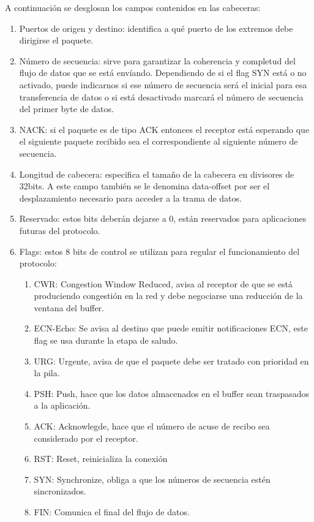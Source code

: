 \documentclass[a4paper,spanish,12pt]{book}
\begin{document}
A continuación se desglosan los campos contenidos en las cabeceras:
\begin{enumerate}
	\item{Puertos de origen y destino: identifica a qué puerto de los extremos debe dirigirse el paquete.}
	\item{Número de secuencia: sirve para garantizar la coherencia y completud del flujo de datos que se está envíando. Dependiendo de si el flag SYN está o no activado, puede indicarnos si ese número de secuencia será el inicial para esa transferencia de datos o si está desactivado marcará el número de secuencia del primer byte de datos.}
	\item{NACK: si el paquete es de tipo ACK entonces el receptor está esperando que el siguiente paquete recibido sea el correspondiente al siguiente número de secuencia.}
	\item{Longitud de cabecera: especifica el tamaño de la cabecera en divisores de 32bits. A este campo tambi\'en se le denomina data-offset por ser el desplazamiento necesario para acceder a la trama de datos.}
	\item{Reservado: estos bits deberán dejarse a 0, están reservados para aplicaciones futuras del protocolo.}
	\item{Flags: estos 8 bits de control se utilizan para regular el funcionamiento del protocolo:
		\begin{enumerate}
			\item{CWR: Congestion Window Reduced, avisa al receptor de que se está produciendo congestión en la red y debe negociarse una reducción de la ventana del buffer.}
			\item{ECN-Echo: Se avisa al destino que puede emitir notificaciones ECN, este flag se usa durante la etapa de saludo.}
			\item{URG: Urgente, avisa de que el paquete debe ser tratado con prioridad en la pila.}
			\item{PSH: Push, hace que los datos almacenados en el buffer sean traspasados a la aplicación.}
			\item{ACK: Acknowlegde, hace que el número de acuse de recibo sea considerado por el receptor.}
			\item{RST: Reset, reinicializa la conexión}
			\item{SYN: Synchronize, obliga a que los números de secuencia est\'en sincronizados.}
			\item{FIN: Comunica el final del flujo de datos.}
		\end{enumerate}
	}

\end{enumerate}
\end{document}
